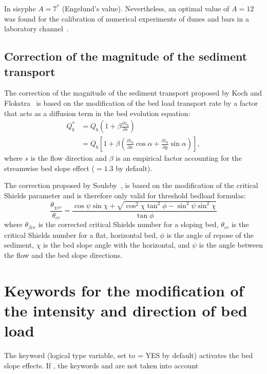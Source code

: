 In sisyphe{} $A=7^*$ (Engelund's value). Nevertheless, an optimal value of $A=12$ was found for the calibration of numerical experiments of dunes and bars in a laboratory channel~\cite{Mendoza15}.

\subsection{Correction of the magnitude of the sediment transport}
The correction of the magnitude of the sediment transport proposed by Koch and Flokstra~\cite{KochFlokstra80} is based on the modification of the bed load transport rate by a factor that acts as a diffusion term in the bed evolution equation:
\begin{equation}
\begin{array}{ll} \displaystyle
Q_b^* &= Q_{b}\left(1+\beta\frac{\partial z_b}{\partial s}\right) \\
    &= Q_{b}\left[1 + \beta \left(\frac{\partial z_b}{\partial x} \cos\alpha + \frac{\partial z_b}{\partial y} \sin\alpha\right)\right],
\end{array}
\end{equation}
where $s$ is the flow direction and $\beta$ is an empirical factor accounting for the streamwise bed slope effect ($=1.3$ by default).

The correction proposed by Soulsby~\cite{Soulsby97}, is based on the modification of the critical Shields parameter and is therefore only valid for threshold bedload formulas:
\begin{equation*}
\frac{\theta_{\chi cr}}{\theta_{cr}} = \frac{\cos\psi \sin\chi + 
\sqrt{\cos^2\chi \tan^2\phi - \sin^2\psi \sin^2\chi}}{\tan
\phi}
\end{equation*}
where $\theta_{\beta cr}$ is the corrected critical Shields number for a sloping bed, $\theta_{cr}$ is the critical Shields number for a flat, horizontal bed, $\phi$ is the angle of repose of the sediment, $\chi$ is the bed slope angle with the horizontal, and $\psi$ is the angle between the flow and the bed slope directions.

\section{Keywords for the modification of the intensity and direction of bed load}
The keyword  (logical type variable, set to {\ttfamily = YES} by default) activates the bed slope effects. If , the keywords  and  are not taken into account

